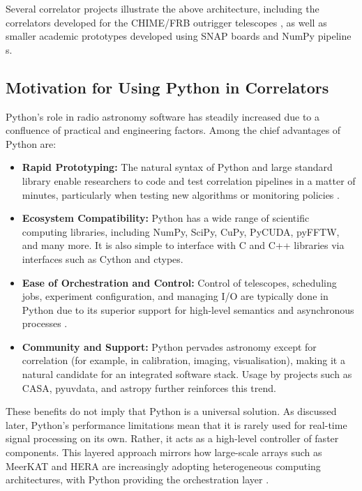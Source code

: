     Several correlator projects illustrate the above architecture, including the correlators developed for the CHIME/FRB outrigger telescopes \cite{Leung2024}, as well as smaller academic prototypes developed using SNAP boards and NumPy pipeline s\cite{Gorthi2021}.

    \subsection{Motivation for Using Python in Correlators}
    Python’s role in radio astronomy software has steadily increased due to a confluence of practical and engineering factors. Among the chief advantages of Python are:

   \begin{itemize}
        \item \textbf{Rapid Prototyping:} The natural syntax of Python and large standard library enable researchers to code and test correlation pipelines in a matter of minutes, particularly when testing new algorithms or monitoring policies \cite{Leung2024}.
            
        \item \textbf{Ecosystem Compatibility:}
        Python has a wide range of scientific computing libraries, including NumPy, SciPy, CuPy, PyCUDA, pyFFTW, and many more. It is also simple to interface with C and C++ libraries via interfaces such as Cython and ctypes.
        
        \item \textbf{Ease of Orchestration and Control:} Control of telescopes, scheduling jobs, experiment configuration, and managing I/O are typically done in Python due to its superior support for high-level semantics and asynchronous processes \cite{Merry2023}.
        
        \item \textbf{Community and Support:} Python pervades astronomy except for correlation (for example, in calibration, imaging, visualisation), making it a natural candidate for an integrated software stack. Usage by projects such as CASA, pyuvdata, and astropy further reinforces this trend.
    \end{itemize}

    These benefits do not imply that Python is a universal solution. As discussed later, Python’s performance limitations mean that it is rarely used for real-time signal processing on its own. Rather, it acts as a high-level controller of faster components. This layered approach mirrors how large-scale arrays such as MeerKAT and HERA are increasingly adopting heterogeneous computing architectures, with Python providing the orchestration layer \cite{Merry2023, Gorthi2021}.

